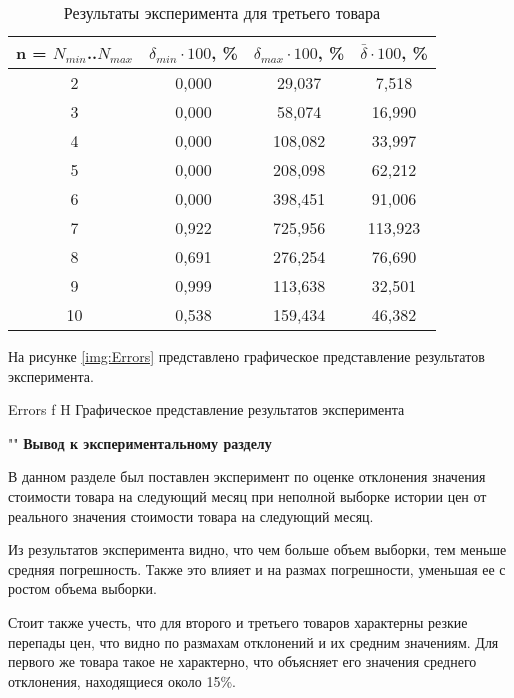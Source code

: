 \documentclass[a4paper]{bmstu}
\begin{document}
\begin{table}[H]
	\caption{Результаты эксперимента для третьего товара}
	\begin{center}
		\begin{tabular}{| c | c | c | c |} 
			\hline
			
			\textbf{n = $N_{min}$..$N_{max}$} & \textbf{$\delta_{min} \cdot 100$, \%} & \textbf{$\delta_{max} \cdot 100$, \%} & \textbf{$\bar{\delta} \cdot 100$, \%} \\   
			
			\hline
			2 & 0,000 & 29,037 & 7,518\\
			\hline
			3 & 0,000 & 58,074 & 16,990\\
			\hline
			4 & 0,000 & 108,082 & 33,997\\
			\hline
			5 & 0,000 & 208,098 & 62,212\\
			\hline
			6 & 0,000 & 398,451 & 91,006\\
			\hline
			7 & 0,922 & 725,956 & 113,923\\
			\hline
			8 & 0,691 & 276,254 & 76,690\\
			\hline
			9 & 0,999 & 113,638 & 32,501\\
			\hline
			10 & 0,538 & 159,434 & 46,382\\
			\hline
		\end{tabular}
	\end{center}
\end{table}

На рисунке \ref{img:Errors} представлено графическое представление результатов эксперимента.
 
{Errors}
{f}
{H}
{\textwidth}
{Графическое представление результатов эксперимента}

""\newline
\noindent\textbf{Вывод к экспериментальному разделу}

В данном разделе был поставлен эксперимент по оценке отклонения значения стоимости товара на следующий месяц при неполной выборке истории цен от реального значения стоимости товара на следующий месяц.

Из результатов эксперимента видно, что чем больше объем выборки, тем меньше средняя погрешность. Также это влияет и на размах погрешности, уменьшая ее с ростом объема выборки. 

Стоит также учесть, что для второго и третьего товаров характерны резкие перепады цен, что видно по размахам отклонений и их средним значениям. Для первого же товара такое не характерно, что объясняет его значения среднего отклонения, находящиеся около 15\%. 
\end{document}

